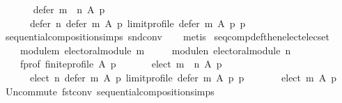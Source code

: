 \begin{isabellebody}
\ \ \isanewline
\ \ \ \ {\isachardoublequoteopen}defer\ {\isacharparenleft}{\kern0pt}m\ {\isasymtriangleright}\ n{\isacharparenright}{\kern0pt}\ A\ p\ {\isacharequal}{\kern0pt}\isanewline
\ \ \ \ \ \ defer\ n\ {\isacharparenleft}{\kern0pt}defer\ m\ A\ p{\isacharparenright}{\kern0pt}\ {\isacharparenleft}{\kern0pt}limit{\isacharunderscore}{\kern0pt}profile\ {\isacharparenleft}{\kern0pt}defer\ m\ A\ p{\isacharparenright}{\kern0pt}\ p{\isacharparenright}{\kern0pt}{\isachardoublequoteclose}\isanewline
%
\isadelimproof
\ \ %
\endisadelimproof
%
\isatagproof
{}\isamarkupfalse%
\ sequential{\isacharunderscore}{\kern0pt}composition{\isachardot}{\kern0pt}simps\ snd{\isacharunderscore}{\kern0pt}conv\isanewline
\ \ \isamarkupfalse%
\ metis%
\endisatagproof
{\isafoldproof}%
%
\isadelimproof
\isanewline
%
\endisadelimproof
\isanewline
{}\isamarkupfalse%
\ seq{\isacharunderscore}{\kern0pt}comp{\isacharunderscore}{\kern0pt}def{\isacharunderscore}{\kern0pt}then{\isacharunderscore}{\kern0pt}elect{\isacharunderscore}{\kern0pt}elec{\isacharunderscore}{\kern0pt}set{\isacharcolon}{\kern0pt}\isanewline
\ \ \isanewline
\ \ \ \ module{\isacharunderscore}{\kern0pt}m{\isacharcolon}{\kern0pt}\ {\isachardoublequoteopen}electoral{\isacharunderscore}{\kern0pt}module\ m{\isachardoublequoteclose}\ \isanewline
\ \ \ \ module{\isacharunderscore}{\kern0pt}n{\isacharcolon}{\kern0pt}\ {\isachardoublequoteopen}electoral{\isacharunderscore}{\kern0pt}module\ n{\isachardoublequoteclose}\ \isanewline
\ \ \ \ f{\isacharunderscore}{\kern0pt}prof{\isacharcolon}{\kern0pt}\ {\isachardoublequoteopen}finite{\isacharunderscore}{\kern0pt}profile\ A\ p{\isachardoublequoteclose}\isanewline
\ \ \isanewline
\ \ \ \ {\isachardoublequoteopen}elect\ {\isacharparenleft}{\kern0pt}m\ {\isasymtriangleright}\ n{\isacharparenright}{\kern0pt}\ A\ p\ {\isacharequal}{\kern0pt}\isanewline
\ \ \ \ \ \ elect\ n\ {\isacharparenleft}{\kern0pt}defer\ m\ A\ p{\isacharparenright}{\kern0pt}\ {\isacharparenleft}{\kern0pt}limit{\isacharunderscore}{\kern0pt}profile\ {\isacharparenleft}{\kern0pt}defer\ m\ A\ p{\isacharparenright}{\kern0pt}\ p{\isacharparenright}{\kern0pt}\ {\isasymunion}\isanewline
\ \ \ \ \ \ {\isacharparenleft}{\kern0pt}elect\ m\ A\ p{\isacharparenright}{\kern0pt}{\isachardoublequoteclose}\isanewline
%
\isadelimproof
\ \ %
\endisadelimproof
%
\isatagproof
{}\isamarkupfalse%
\ Un{\isacharunderscore}{\kern0pt}commute\ fst{\isacharunderscore}{\kern0pt}conv\ sequential{\isacharunderscore}{\kern0pt}composition{\isachardot}{\kern0pt}simps\isanewline

\end{isabellebody}
